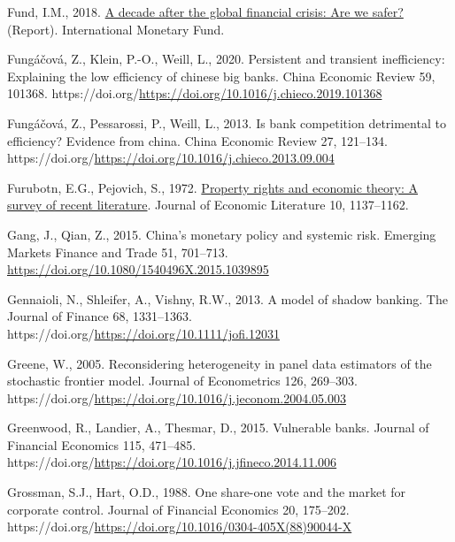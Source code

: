 \documentclass[
  12pt,
  a4paper,
]{scrreprt}
\newlength{\cslhangindent}
\newenvironment{CSLReferences}[2] %
 {\begin{list}{}{%
  \setlength{\itemindent}{0pt}
  \setlength{\leftmargin}{0pt}
  \setlength{\parsep}{0pt}
  \ifodd #1
   \setlength{\leftmargin}{\cslhangindent}
   \setlength{\itemindent}{-1\cslhangindent}
  \fi
  \setlength{\itemsep}{#2\baselineskip}}}
 {\end{list}}
\begin{document}
{{{{\begin{CSLReferences}{1}{0}
Fund, I.M., 2018.
\href{https://www.imf.org/en/Publications/GFSR/Issues/2018/09/25/Global-Financial-Stability-Report-October-2018\#:~:text=Chapter\%201\%3A\%20A\%20Decade\%20after,economies\%20and\%20escalating\%20trade\%20tensions.}{A
decade after the global financial crisis: Are we safer?} (Report).
International Monetary Fund.

Fungáčová, Z., Klein, P.-O., Weill, L., 2020. Persistent and transient
inefficiency: Explaining the low efficiency of chinese big banks. China
Economic Review 59, 101368.
https://doi.org/\url{https://doi.org/10.1016/j.chieco.2019.101368}

Fungáčová, Z., Pessarossi, P., Weill, L., 2013. Is bank competition
detrimental to efficiency? Evidence from china. China Economic Review
27, 121--134.
https://doi.org/\url{https://doi.org/10.1016/j.chieco.2013.09.004}

Furubotn, E.G., Pejovich, S., 1972.
\href{http://www.jstor.org/stable/2721541}{Property rights and economic
theory: A survey of recent literature}. Journal of Economic Literature
10, 1137--1162.

Gang, J., Qian, Z., 2015. China's monetary policy and systemic risk.
Emerging Markets Finance and Trade 51, 701--713.
\url{https://doi.org/10.1080/1540496X.2015.1039895}

Gennaioli, N., Shleifer, A., Vishny, R.W., 2013. A model of shadow
banking. The Journal of Finance 68, 1331--1363.
https://doi.org/\url{https://doi.org/10.1111/jofi.12031}

Greene, W., 2005. Reconsidering heterogeneity in panel data estimators
of the stochastic frontier model. Journal of Econometrics 126, 269--303.
https://doi.org/\url{https://doi.org/10.1016/j.jeconom.2004.05.003}

Greenwood, R., Landier, A., Thesmar, D., 2015. Vulnerable banks. Journal
of Financial Economics 115, 471--485.
https://doi.org/\url{https://doi.org/10.1016/j.jfineco.2014.11.006}

Grossman, S.J., Hart, O.D., 1988. One share-one vote and the market for
corporate control. Journal of Financial Economics 20, 175--202.
https://doi.org/\url{https://doi.org/10.1016/0304-405X(88)90044-X}


\end{CSLReferences}}}}}
\end{document}
